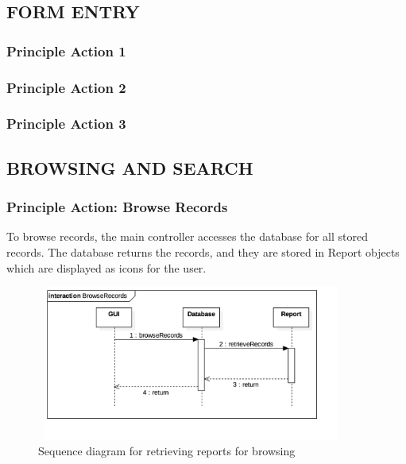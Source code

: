 \documentclass[twoside,letterpaper]{article}
\begin{document}
{\subsection[FORM ENTRY]{\rmfamily\bfseries\color{black}
FORM ENTRY}
\subsubsection{Principle Action 1}
\subsubsection{Principle Action 2}
\subsubsection{Principle Action 3}

\subsection[BROWSING AND SEARCH]{\rmfamily\bfseries\color{black}
BROWSING AND SEARCH}
\subsubsection{Principle Action: Browse Records}
To browse records, the main controller accesses the database for all stored records. The database returns the records, and they are stored in Report objects which are displayed as icons for the user.
\begin{figure}[H]
\centering
\includegraphics[width=4in,height=2in]{BrowseRecords.png}
\caption{Sequence diagram for retrieving reports for browsing}
\end{figure}
}
\end{document}
